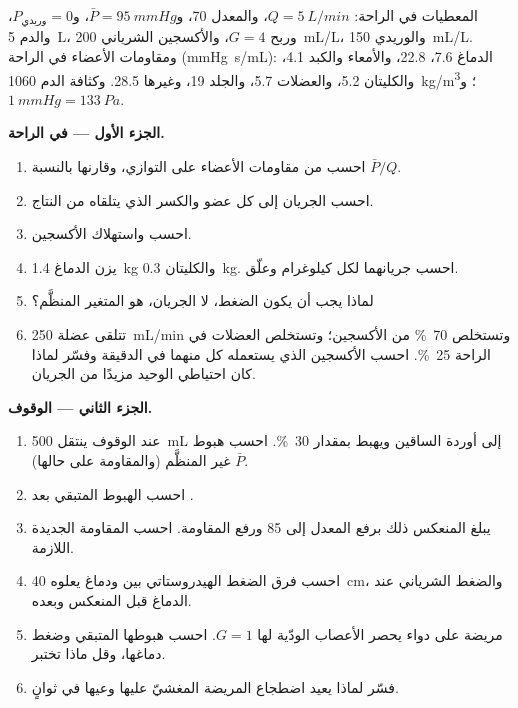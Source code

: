 \begin{problem}
\label{pb:b2:blood-pressure:1}
المعطيات في الراحة: $Q = \qty{5}{L/min}$، والمعدل 70، و$\bar P = \qty{95}{mmHg}$،
و$P_{\text{وريدي}} = 0$، والدم \qty{5}{L}، وربح  $G = 4$،
والأكسجين الشرياني \qty{200}{mL/L}، والوريدي \qty{150}{mL/L}. ومقاومات
الأعضاء في الراحة (\unit{mmHg.s/mL}): الدماغ 7.6،  22.8، والأمعاء
والكبد 4.1، والكليتان 5.2، والعضلات 5.7، والجلد 19، وغيرها 28.5. وكثافة
الدم \qty{1060}{kg/m^3}؛ و$\qty{1}{mmHg} = \qty{133}{Pa}$.

\medskip
\noindent\textbf{الجزء الأول --- في الراحة.}
\begin{enumerate}
  \item احسب  من مقاومات الأعضاء
        على التوازي، وقارنها بالنسبة $\bar P/Q$.
  \item احسب الجريان إلى كل عضو والكسر الذي يتلقاه من
        النتاج.
  \item احسب  واستهلاك الأكسجين.
  \item يزن الدماغ \qty{1.4}{kg} والكليتان \qty{0.3}{kg}.
        احسب جريانهما لكل كيلوغرام وعلّق.
  \item لماذا يجب أن يكون الضغط، لا الجريان، هو المتغير
        المنظَّم؟
  \item تتلقى عضلة  \qty{250}{mL/min} وتستخلص
        \qty{70}{\%} من الأكسجين؛ وتستخلص العضلات في الراحة
        \qty{25}{\%}. احسب الأكسجين الذي يستعمله كل منهما في
        الدقيقة وفسّر لماذا كان احتياطي  الوحيد مزيدًا من الجريان.
\end{enumerate}

\medskip
\noindent\textbf{الجزء الثاني --- الوقوف.}
\begin{enumerate}[resume]
  \item عند الوقوف ينتقل \qty{500}{mL} إلى أوردة الساقين ويهبط
         بمقدار \qty{30}{\%}. احسب هبوط $\bar P$
        غير المنظَّم (والمقاومة على حالها).
  \item احسب الهبوط المتبقي بعد .
  \item يبلغ المنعكس ذلك برفع المعدل إلى 85 ورفع
        المقاومة. احسب المقاومة الجديدة اللازمة.
  \item احسب فرق الضغط الهيدروستاتي بين 
        ودماغ يعلوه \qty{40}{cm}، والضغط الشرياني عند الدماغ
        قبل المنعكس وبعده.
  \item مريضة على دواء يحصر الأعصاب الودّية لها
        $G = 1$. احسب هبوطها المتبقي وضغط دماغها،
        وقل ماذا تختبر.
  \item فسّر لماذا يعيد اضطجاع المريضة المغشيّ عليها
        وعيها في ثوانٍ.
\end{enumerate}


\end{problem}
